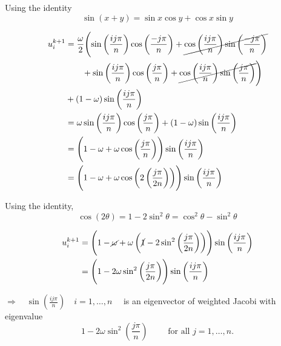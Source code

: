 Using the identity
\begin{equation*}
\sin (x+y) = \sin x \cos y + \cos x \sin y
\end{equation*}

\begin{align*}
  u_i^{k+1} &=
              \frac{\omega}{2}
              \Biggl(  
              \sin \left( \frac{ij\pi}{n} \right) \cos \left(  \frac{-j\pi}{n} \right)
               + \cancel{\cos \left( \frac{ij\pi}{n} \right) \sin \left(  \frac{-j\pi}{n} \right)}\\
               &\qquad + \sin \left( \frac{ij\pi}{n} \right) \cos \left(  \frac{j\pi}{n} \right)
               + \cancel{\cos \left( \frac{ij\pi}{n} \right) \sin \left(  \frac{j\pi}{n} \right) }\Biggr)\\
              &+(1-\omega)\sin \left( \frac{ij\pi}{n} \right)\\
  &= \omega \sin \left( \frac{ij\pi}{n} \right) \cos \left(  \frac{j\pi}{n} \right)
              +(1-\omega)\sin \left( \frac{ij\pi}{n} \right)\\
  &= \Biggl(  1-\omega+\omega \cos \left(  \frac{j\pi}{n} \right) \Biggr) \sin \left( \frac{ij\pi}{n} \right)\\
  &= \Biggl(  1-\omega+\omega \cos \left( 2 \left(  \frac{j\pi}{2n}\right) \right) \Biggr) \sin \left( \frac{ij\pi}{n} \right)\\
\end{align*}

Using the identity, 
\begin{equation*}
\cos (2\theta) = 1 - 2 \sin^2 \theta = \cos^2\theta - \sin^2\theta
\end{equation*}

\begin{align*}
  u_i^{k+1} &= \Biggl(  1-\cancel{\omega}+\omega  \left( \cancel{1}- 2\sin^2 \left(  \frac{j\pi}{2n}\right) \right) \Biggr) \sin \left( \frac{ij\pi}{n} \right)\\
   &= \Biggl(  1- 2\omega\sin^2 \left(  \frac{j\pi}{2n}\right) \Biggr) \sin \left( \frac{ij\pi}{n} \right)\\
\end{align*}

$\Rightarrow \quad \sin \left( \frac{ij\pi}{n} \right)\quad i=1, \ldots, n\quad$
is an eigenvector of weighted Jacobi with eigenvalue
\begin{equation*}
1-2 \omega \sin^2 \left( \frac{j\pi}{n}\right) \qquad \text{ for all } j =1, \ldots, n.
\end{equation*}

